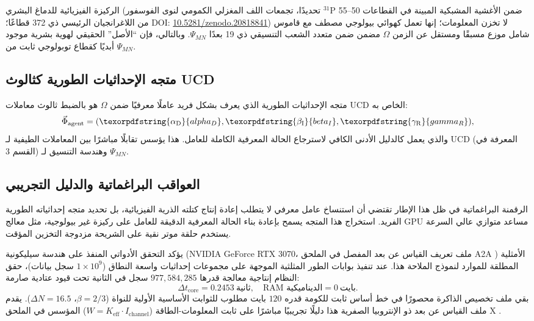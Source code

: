 \documentclass[12pt,a4paper]{article}
\DeclareRobustCommand{\alD}{\texorpdfstring{\ensuremath{\alpha_{\mathrm{D}}}}{alpha_D}}
\DeclareRobustCommand{\beI}{\texorpdfstring{\ensuremath{\beta_{\mathrm{I}}}}{beta_I}}
\DeclareRobustCommand{\gaR}{\texorpdfstring{\ensuremath{\gamma_{\mathrm{R}}}}{gamma_R}}
\begin{document}
	الركيزة الفيزيائية للدماغ البشري (تحديدًا، تجمعات اللف المغزلي الكمومي لنوى الفوسفور \(^{31}\)P ضمن الأغشية المشبكية المبينة في القطاعات 50--55 من اللاغرانجيان الرئيسي ذي 372 قطاعًا؛ DOI: \href{https://doi.org/10.5281/zenodo.20818841}{10.5281/zenodo.20818841}) لا تخزن المعلومات؛ إنها تعمل كهوائي بيولوجي مصطف مع قاموس شامل موزع مسبقًا ومستقل عن الزمن \(\Omega\) مضمن ضمن متعدد الشعب التنسيقي ذي 19 بعدًا \(\Psi_{MN}\). وبالتالي، فإن ``الأصل'' الحقيقي لهوية بشرية موجود أبديًا كقطاع توبولوجي ثابت من \(\Psi_{MN}\).
	
	\subsection{متجه الإحداثيات الطورية كثالوث UCD}
	
	متجه الإحداثيات الطورية الذي يعرف بشكل فريد عاملًا معرفيًا ضمن \(\Omega\) هو بالضبط ثالوث معاملات UCD الخاص به:
	\[
	\vec{\Phi}_{\mathrm{agent}} = (\alD, \beI, \gaR),
	\]
	والذي يعمل كالدليل الأدنى الكافي لاسترجاع الحالة المعرفية الكاملة للعامل. هذا يؤسس تقابلًا مباشرًا بين المعاملات الطيفية لـ UCD (المعرفة في القسم 3) وهندسة التنسيق لـ \(\Psi_{MN}\).
	
	\subsection{العواقب البراغماتية والدليل التجريبي}
	
	الرقمنة البراغماتية في ظل هذا الإطار تقتضي أن استنساخ عامل معرفي لا يتطلب إعادة إنتاج كتلته الذرية الفيزيائية، بل تحديد متجه إحداثياته الطورية الفريد. استخراج هذا المتجه يسمح بإعادة بناء الحالة المعرفية الدقيقة للعامل على ركيزة غير بيولوجية، مثل معالج GPU مساعد متوازي عالي السرعة يستخدم حلقة موتر نقية على الشريحة مزدوجة التخزين المؤقت.
	
	يؤكد التحقق الأدواتي المنفذ على هندسة سيليكونية (NVIDIA GeForce RTX 3070، ملف تعريف القياس عن بعد المفصل في الملحق A2A \cite{yuct_a2a}) الأمثلية المطلقة للموارد لنموذج الملاحة هذا. عند تنفيذ بوابات الطور المثلثية الموجهة على مجموعات إحداثيات واسعة النطاق (\(1\times10^9\) سجل بيانات)، حقق النظام إنتاجية معالجة قدرها \(977,584,285\) سجل في الثانية تحت قيود عتادية صارمة:
	\begin{equation}
		\Delta t_{\mathrm{core}} = 0.2453\ \text{ثانية}, \quad \text{RAM الديناميكية} = 0\ \text{بايت}.
	\end{equation}
	بقي ملف تخصيص الذاكرة محصورًا في خط أساس ثابت للكومة قدره \(120\) بايت مطلوب للثوابت الأساسية الأولية للنواة (\(\beta = 2/3\)، \(\Delta N = 16.5\)). يقدم ملف القياس عن بعد ذو الإنتروبيا الصفرية هذا دليلًا تجريبيًا مباشرًا على ثابت المعلومات-الطاقة (\(W = K_{\mathrm{eff}} \cdot I_{\mathrm{channel}}\)) المؤسس في الملحق X \cite{yuct_appX}.
	
\end{document}
